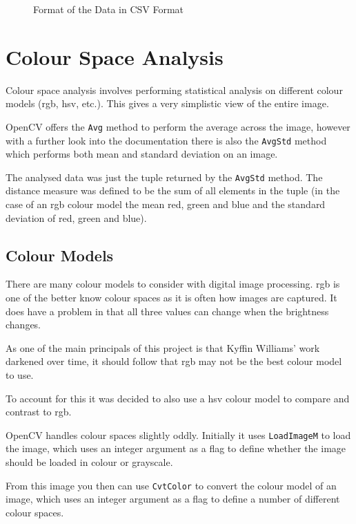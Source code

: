\begin{figure}[h]
\caption{Format of the Data in CSV Format}\label{fig:csv-spreadsheet}
\end{figure}


\section{Colour Space Analysis}
Colour space analysis involves performing statistical analysis on different colour models 
(\gls{rgb}, \gls{hsv}, etc.). This gives a very simplistic view of the entire image.

OpenCV offers the \texttt{Avg} method to perform the average across the image, however with a 
further look into the documentation there is also the \texttt{AvgStd} method which performs both 
mean and standard deviation on an image.

The analysed data was just the tuple returned by the \texttt{AvgStd} method. The distance measure
was defined to be the sum of all elements in the tuple (in the case of an \gls{rgb} colour model
the mean red, green and blue and the standard deviation of red, green and blue).

\subsection{Colour Models}
There are many colour models to consider with digital image processing. \Gls{rgb} is one of the
better know colour spaces as it is often how images are captured. It does have a problem in that
all three values can change when the brightness changes.

As one of the main principals of this project is that Kyffin Williams' work darkened over time, it
should follow that \gls{rgb} may not be the best colour model to use.

To account for this it was decided to also use a \gls{hsv} colour model to compare and contrast to
\gls{rgb}.

OpenCV handles colour spaces slightly oddly. Initially it uses \texttt{LoadImageM} to load the 
image, which uses an integer argument as a flag to define whether the image should be loaded in 
colour or grayscale.

From this image you then can use \texttt{CvtColor} to convert the colour model of an image, which 
uses an integer argument as a flag to define a number of different colour spaces.

